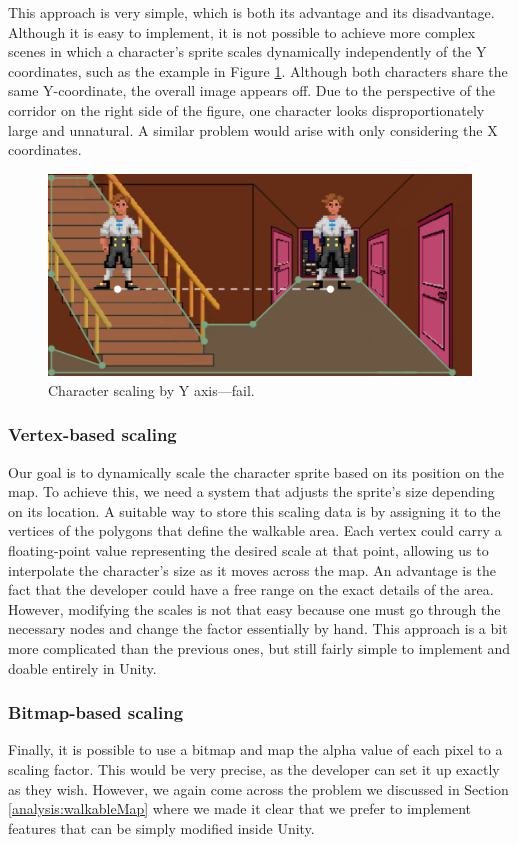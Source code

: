 This approach is very simple, which is both its advantage and its disadvantage. Although it is easy to implement, it is not possible to achieve more complex scenes in which a character's sprite scales dynamically independently of the Y coordinates, such as the example in Figure \ref{fig:ScaleF}. Although both characters share the same Y-coordinate, the overall image appears off. Due to the perspective of the corridor on the right side of the figure, one character looks disproportionately large and unnatural.  A similar problem would arise with only considering the X coordinates.

\begin{figure}[H]
\centering
\includegraphics[width=.7\linewidth]{img/scalef-y.png}
\caption{Character scaling by Y axis—fail.}
\label{fig:ScaleF}
\end{figure}

\subsubsection{Vertex-based scaling}
Our goal is to dynamically scale the character sprite based on its position on the map. To achieve this, we need a system that adjusts the sprite’s size depending on its location. A suitable way to store this scaling data is by assigning it to the vertices of the polygons that define the walkable area. Each vertex could carry a floating-point value representing the desired scale at that point, allowing us to interpolate the character's size as it moves across the map.  An advantage is the fact that the developer could have a free range on the exact details of the area. However, modifying the scales is not that easy because one must go through the necessary nodes and change the factor essentially by hand. This approach is a bit more complicated than the previous ones, but still fairly simple to implement and doable entirely in Unity.

\subsubsection{Bitmap-based scaling}
Finally, it is possible to use a bitmap and map the alpha value of each pixel to a scaling factor. This would be very precise, as the developer can set it up exactly as they wish. However, we again come across the problem we discussed in Section \ref{analysis:walkableMap} where we made it clear that we prefer to implement features that can be simply modified inside Unity.

